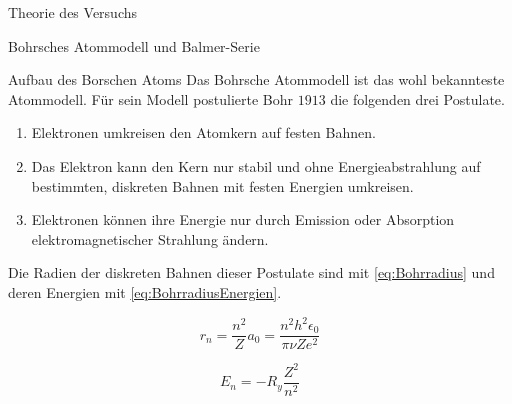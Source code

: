 \documentclass[pdftex, a4paper,11pt, twoside, ngerman]{report}
\begin{document}
\begin{chapter}{Theorie des Versuchs}
    
    
    \begin{section}{Bohrsches Atommodell und Balmer-Serie}
      \label{chp:TheorieBohrBalmerSerie}
      
      
      
      \begin{subsection}{Aufbau des Borschen Atoms}
        \label{chp:TheorieBohrBalmerSerieAufbauAtomhuelle}
        Das Bohrsche Atommodell ist das wohl bekannteste Atommodell. Für sein Modell postulierte Bohr $1913$ die folgenden drei Postulate.
        \begin{enumerate}
          \item Elektronen umkreisen den Atomkern auf festen Bahnen.
          \item Das Elektron kann den Kern nur stabil und ohne Energieabstrahlung auf bestimmten, diskreten Bahnen mit festen Energien umkreisen.
          \item Elektronen können ihre Energie nur durch Emission oder Absorption elektromagnetischer Strahlung ändern.
        \end{enumerate}
        Die Radien der diskreten Bahnen dieser Postulate sind mit \cref{eq:Bohrradius} und deren Energien mit \cref{eq:BohrradiusEnergien}.
        \newline
        \begin{minipage}{.48\textwidth}
          \begin{equation}
            \label{eq:Bohrradius}
            r_{n}=\frac{n^{2}}{Z}a_{0}=\frac{n^{2}h^{2}\epsilon_{0}}{\pi\nu Ze^{2}}
          \end{equation}
        \end{minipage}
        \begin{minipage}{.48\textwidth}
          \begin{equation}
            \label{eq:BohrradiusEnergien}
            E_{n}=-R_{y}\frac{Z^{2}}{n^{2}}
          \end{equation}
        \end{minipage}
        
        
      \end{subsection}
      

\end{section}
\end{chapter}
\end{document}
